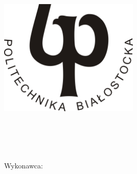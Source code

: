 \begin{titlepage}
\begin{center}

\includegraphics[width=0.5\textwidth]{./logo_PB}~\\[0.5cm]
\textsc{\LARGE \titlelinea}\\[0.5cm]
\textsc{\Large \titlelineb}\\[1.5cm]

\textsc{{ \LARGE  \titlelinec \\[0.5cm] }}
{ \large \bfseries \titlelined \\[1.5cm] }


\begin{flushright} \large
Wykonawca: \textsc{\wykonawca}\\[1.5cm]
\end{flushright}


\begin{flushleft} \large
\promotorstring\textsc{\promotor}
\end{flushleft}

\vfill
{\large \data}

\end{center}


\end{titlepage}
